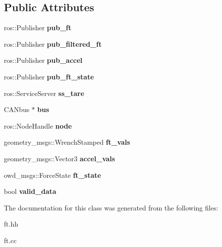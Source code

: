 \subsection*{Public Attributes}
\begin{DoxyCompactItemize}
\item 
\hypertarget{classFT_a124fa2dbd58ea3a01e61ff3f9246f8af}{ros\-::\-Publisher {\bfseries pub\-\_\-ft}}\label{classFT_a124fa2dbd58ea3a01e61ff3f9246f8af}

\item 
\hypertarget{classFT_aaef98683d3cd1804b3728badf2fa5251}{ros\-::\-Publisher {\bfseries pub\-\_\-filtered\-\_\-ft}}\label{classFT_aaef98683d3cd1804b3728badf2fa5251}

\item 
\hypertarget{classFT_a4b1b858c8b2f660118e9340915fcf056}{ros\-::\-Publisher {\bfseries pub\-\_\-accel}}\label{classFT_a4b1b858c8b2f660118e9340915fcf056}

\item 
\hypertarget{classFT_a5e51bc3634ca3e03bb8390032cc7677a}{ros\-::\-Publisher {\bfseries pub\-\_\-ft\-\_\-state}}\label{classFT_a5e51bc3634ca3e03bb8390032cc7677a}

\item 
\hypertarget{classFT_a27707e40bb823b58c7abd0052aacb8b2}{ros\-::\-Service\-Server {\bfseries ss\-\_\-tare}}\label{classFT_a27707e40bb823b58c7abd0052aacb8b2}

\item 
\hypertarget{classFT_ada344cf14813bbe35d038aafdf840fde}{C\-A\-Nbus $\ast$ {\bfseries bus}}\label{classFT_ada344cf14813bbe35d038aafdf840fde}

\item 
\hypertarget{classFT_ae32bdf4e43ea8f37908b4986b5ecc5de}{ros\-::\-Node\-Handle {\bfseries node}}\label{classFT_ae32bdf4e43ea8f37908b4986b5ecc5de}

\item 
\hypertarget{classFT_aafeba31fafa4cbcb4d6419c3d488b27b}{geometry\-\_\-msgs\-::\-Wrench\-Stamped {\bfseries ft\-\_\-vals}}\label{classFT_aafeba31fafa4cbcb4d6419c3d488b27b}

\item 
\hypertarget{classFT_ae8c68c76909495847e3ea4f2c39d309c}{geometry\-\_\-msgs\-::\-Vector3 {\bfseries accel\-\_\-vals}}\label{classFT_ae8c68c76909495847e3ea4f2c39d309c}

\item 
\hypertarget{classFT_ace4414eea2e6ec4246598d26f10ff885}{owd\-\_\-msgs\-::\-Force\-State {\bfseries ft\-\_\-state}}\label{classFT_ace4414eea2e6ec4246598d26f10ff885}

\item 
\hypertarget{classFT_a2a346b1f1ee4785a758e1518ca110fad}{bool {\bfseries valid\-\_\-data}}\label{classFT_a2a346b1f1ee4785a758e1518ca110fad}

\end{DoxyCompactItemize}


The documentation for this class was generated from the following files\-:\begin{DoxyCompactItemize}
\item 
ft.\-hh\item 
ft.\-cc\end{DoxyCompactItemize}
